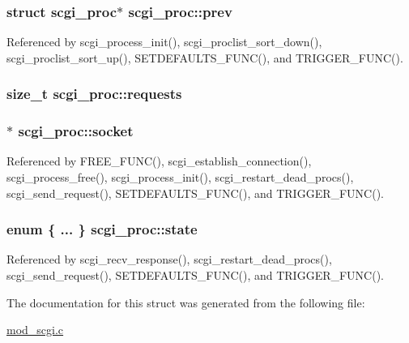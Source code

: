 \hypertarget{structscgi__proc_aa92d0093242bd955f454bff80f30e368}{
\subsubsection[{prev}]{\setlength{\rightskip}{0pt plus 5cm}struct {\bf scgi\-\_\-proc}$\ast$ scgi\-\_\-proc\-::prev}}\label{structscgi__proc_aa92d0093242bd955f454bff80f30e368}


Referenced by scgi\-\_\-process\-\_\-init(), scgi\-\_\-proclist\-\_\-sort\-\_\-down(), scgi\-\_\-proclist\-\_\-sort\-\_\-up(), S\-E\-T\-D\-E\-F\-A\-U\-L\-T\-S\-\_\-\-F\-U\-N\-C(), and T\-R\-I\-G\-G\-E\-R\-\_\-\-F\-U\-N\-C().

\hypertarget{structscgi__proc_a44f6cb8237c073b1394bfb3999ae9a81}{
\subsubsection[{requests}]{\setlength{\rightskip}{0pt plus 5cm}size\-\_\-t scgi\-\_\-proc\-::requests}}\label{structscgi__proc_a44f6cb8237c073b1394bfb3999ae9a81}
\hypertarget{structscgi__proc_ab75f773ba805b864842cc38e6413c9a5}{
\subsubsection[{socket}]{$\ast$ scgi\-\_\-proc\-::socket}}\label{structscgi__proc_ab75f773ba805b864842cc38e6413c9a5}


Referenced by F\-R\-E\-E\-\_\-\-F\-U\-N\-C(), scgi\-\_\-establish\-\_\-connection(), scgi\-\_\-process\-\_\-free(), scgi\-\_\-process\-\_\-init(), scgi\-\_\-restart\-\_\-dead\-\_\-procs(), scgi\-\_\-send\-\_\-request(), S\-E\-T\-D\-E\-F\-A\-U\-L\-T\-S\-\_\-\-F\-U\-N\-C(), and T\-R\-I\-G\-G\-E\-R\-\_\-\-F\-U\-N\-C().

\hypertarget{structscgi__proc_a49e46b6044c5a88b1f7f2503834379ce}{
\subsubsection[{state}]{\setlength{\rightskip}{0pt plus 5cm}enum \{ ... \}   scgi\-\_\-proc\-::state}}\label{structscgi__proc_a49e46b6044c5a88b1f7f2503834379ce}


Referenced by scgi\-\_\-recv\-\_\-response(), scgi\-\_\-restart\-\_\-dead\-\_\-procs(), scgi\-\_\-send\-\_\-request(), S\-E\-T\-D\-E\-F\-A\-U\-L\-T\-S\-\_\-\-F\-U\-N\-C(), and T\-R\-I\-G\-G\-E\-R\-\_\-\-F\-U\-N\-C().



The documentation for this struct was generated from the following file\-:\begin{DoxyCompactItemize}
\item 
\hyperlink{mod__scgi_8c}{mod\-\_\-scgi.\-c}\end{DoxyCompactItemize}
